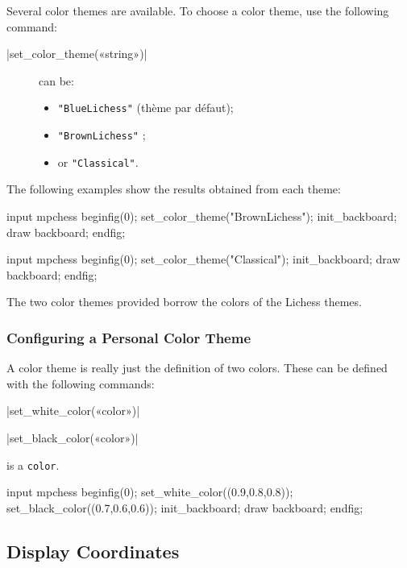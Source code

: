 \documentclass[english]{ltxdoc}
\begin{document}
Several color themes are available. To choose a color theme, use the following
command:

\commande|set_color_theme(«string»)|\smallskip{}

\begin{description}
  \item[] can be:
\begin{itemize}
\item \lstinline+"BlueLichess"+ (thème par défaut);
\item \lstinline+"BrownLichess"+ ;
\item or \lstinline+"Classical"+.
\end{itemize}
\end{description}

The following examples show the results obtained from each theme:
\begin{ExempleMP}
input mpchess
beginfig(0);
set_color_theme("BrownLichess");
init_backboard;
draw backboard;
endfig;
\end{ExempleMP}
\begin{ExempleMP}
input mpchess
beginfig(0);
set_color_theme("Classical");
init_backboard;
draw backboard;
endfig;
\end{ExempleMP}

The two color themes provided borrow the colors of the Lichess themes.


\subsubsection{Configuring a Personal Color Theme}

A color theme is really just the definition of two colors.
These can be defined with the following commands:

\commande|set_white_color(«color»)|\par
\commande|set_black_color(«color»)|\smallskip

 is a \MP{} \lstinline+color+.

\begin{ExempleMP}
input mpchess
beginfig(0);
set_white_color((0.9,0.8,0.8));
set_black_color((0.7,0.6,0.6));
init_backboard;
draw backboard;
endfig;
\end{ExempleMP}
\subsection{Display Coordinates}
\end{document}
